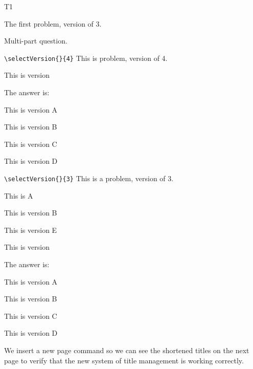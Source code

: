 \documentclass{article}
\begin{document}
\begin{exam}{T1}
\begin{problem}[5]
\begin{solution}
The first problem, version  of 3.
\end{solution}
\end{problem}

\begin{problem*}[2ea]
Multi-part question.
    \begin{parts}
    \item \verb!\selectVersion{}{4}! This is problem, version  of 4.
\begin{solution}
This is version 

The answer is:
\begin{verA}
This is version A
\end{verA}
\begin{verB}
This is version B
\end{verB}
\begin{verC}
This is version C
\end{verC}
\begin{verD}
This is version D
\end{verD}
\end{solution}

    \item \verb!\selectVersion{}{3}! This is a problem, version  of 3.
\begin{verA}
This is A
\end{verA}
\begin{verB}
This is version B
\end{verB}
\begin{verE}
This is version E
\end{verE}

\begin{solution}
This is version 

The answer is:
\begin{verA}
This is version A
\end{verA}
\begin{verB}
This is version B
\end{verB}
\begin{verC}
This is version C
\end{verC}
\begin{verD}
This is version D
\end{verD}
\end{solution}

\pushProblem
\begin{eqComments}
We insert a new page command so we can see the shortened titles on the next page
to verify that the new system of title management is working correctly.
\end{eqComments}
\popProblem


\end{parts}
\end{problem*}
\end{exam}
\end{document}
